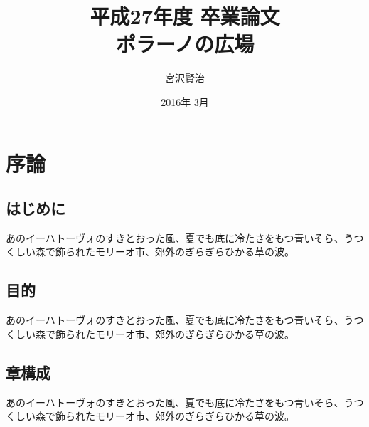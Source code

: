 \documentclass[uplatex,report]{jsbook}
\begin{document}
\title{平成27年度 卒業論文\\
ポラーノの広場}
\author{宮沢賢治}
\date{2016年 3月}
\maketitle
\chapter{序論}
\section{はじめに}
あのイーハトーヴォのすきとおった風、夏でも底に冷たさをもつ青いそら、うつくしい森で飾られたモリーオ市、郊外のぎらぎらひかる草の波。
\section{目的}
あのイーハトーヴォのすきとおった風、夏でも底に冷たさをもつ青いそら、うつくしい森で飾られたモリーオ市、郊外のぎらぎらひかる草の波。
\section{章構成}
あのイーハトーヴォのすきとおった風、夏でも底に冷たさをもつ青いそら、うつくしい森で飾られたモリーオ市、郊外のぎらぎらひかる草の波。
\end{document}
